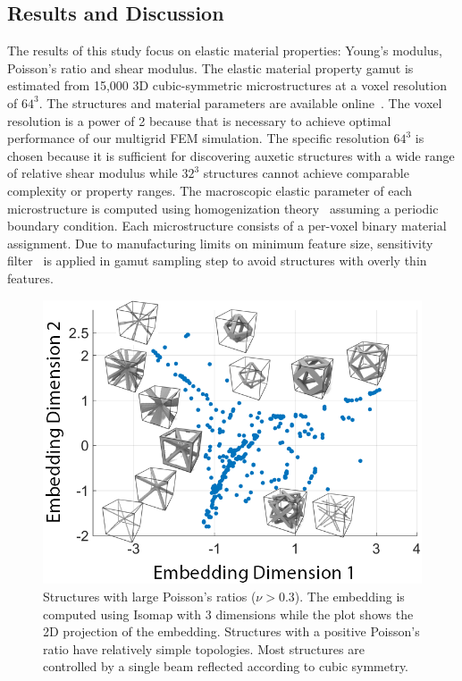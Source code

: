 \subsection{Results and Discussion}
The results of this study focus on elastic material properties: Young's modulus, Poisson's ratio and shear modulus.
The elastic material property gamut is estimated from 15,000 3D cubic-symmetric microstructures at a voxel resolution of $64^3$.
The structures and material parameters are available online~\citep{microDatabase}.
The voxel resolution is a power of 2 because that is necessary to achieve optimal performance of our multigrid FEM simulation.
The specific resolution $64^3$ is chosen because it is sufficient for discovering auxetic structures with a wide range of relative shear modulus while $32^3$ structures cannot achieve comparable complexity or property ranges.
The macroscopic elastic parameter of each microstructure is computed using homogenization theory~\citep{Guedes1990,xia:2015:design} assuming a periodic boundary condition.
Each microstructure consists of a per-voxel binary material assignment. Due to manufacturing limits on minimum feature size,
sensitivity filter~\citep{sigmund:2007} is applied in gamut sampling step to avoid structures with overly thin features.
\begin{figure}
	\centering
	\includegraphics[width=0.5\columnwidth]{images/pprFamily.png}
	\caption{Structures with large Poisson's ratios ($\nu>0.3$). The embedding is computed using Isomap with 3 dimensions while the plot shows the 2D projection of the embedding. Structures with a positive Poisson's ratio have relatively simple topologies. Most structures are controlled by a single beam reflected according to cubic symmetry.}
	\label{fig:pprfamilies}
\end{figure}

